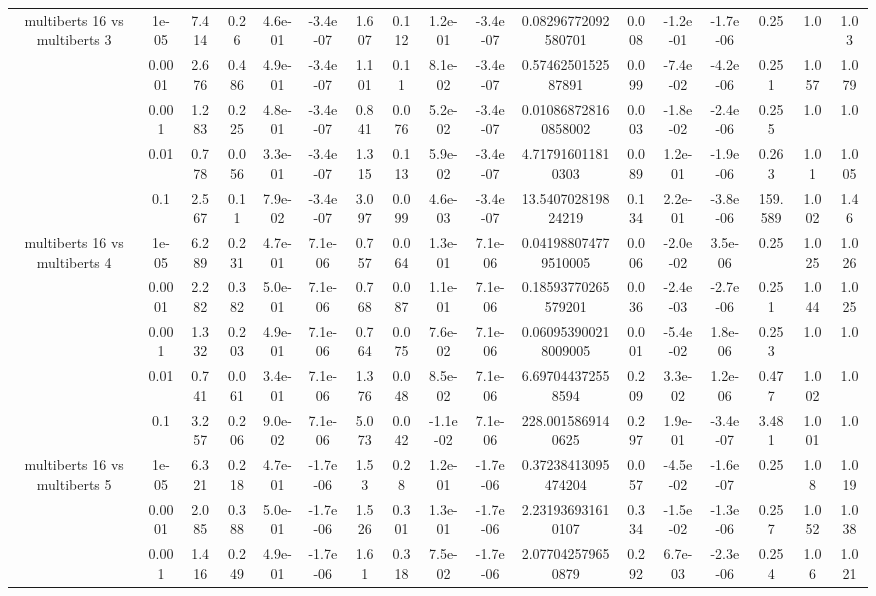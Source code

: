 \begin{tabular}{|c|c|c|c|c|c|c|c|c|c|c|c|c|c|c|c|c|}
\hline
\multirow{5}{*}{multiberts 16 vs multiberts 3} & 1e-05 & 7.414 & 0.26 & 4.6e-01 & -3.4e-07 & 1.607 & 0.112 & 1.2e-01 & -3.4e-07 & 0.08296772092580701 & 0.008 & -1.2e-01 & -1.7e-06 & 0.25 & 1.0 & 1.03 \\
 & 0.0001 & 2.676 & 0.486 & 4.9e-01 & -3.4e-07 & 1.101 & 0.11 & 8.1e-02 & -3.4e-07 & 0.5746250152587891 & 0.099 & -7.4e-02 & -4.2e-06 & 0.251 & 1.057 & 1.079 \\
 & 0.001 & 1.283 & 0.225 & 4.8e-01 & -3.4e-07 & 0.841 & 0.076 & 5.2e-02 & -3.4e-07 & 0.010868728160858002 & 0.003 & -1.8e-02 & -2.4e-06 & 0.255 & 1.0 & 1.0 \\
 & 0.01 & 0.778 & 0.056 & 3.3e-01 & -3.4e-07 & 1.315 & 0.113 & 5.9e-02 & -3.4e-07 & 4.717916011810303 & 0.089 & 1.2e-01 & -1.9e-06 & 0.263 & 1.01 & 1.005 \\
 & 0.1 & 2.567 & 0.11 & 7.9e-02 & -3.4e-07 & 3.097 & 0.099 & 4.6e-03 & -3.4e-07 & 13.540702819824219 & 0.134 & 2.2e-01 & -3.8e-06 & 159.589 & 1.002 & 1.46 \\
\hline
\multirow{5}{*}{multiberts 16 vs multiberts 4} & 1e-05 & 6.289 & 0.231 & 4.7e-01 & 7.1e-06 & 0.757 & 0.064 & 1.3e-01 & 7.1e-06 & 0.041988074779510005 & 0.006 & -2.0e-02 & 3.5e-06 & 0.25 & 1.025 & 1.026 \\
 & 0.0001 & 2.282 & 0.382 & 5.0e-01 & 7.1e-06 & 0.768 & 0.087 & 1.1e-01 & 7.1e-06 & 0.18593770265579201 & 0.036 & -2.4e-03 & -2.7e-06 & 0.251 & 1.044 & 1.025 \\
 & 0.001 & 1.332 & 0.203 & 4.9e-01 & 7.1e-06 & 0.764 & 0.075 & 7.6e-02 & 7.1e-06 & 0.060953900218009005 & 0.001 & -5.4e-02 & 1.8e-06 & 0.253 & 1.0 & 1.0 \\
 & 0.01 & 0.741 & 0.061 & 3.4e-01 & 7.1e-06 & 1.376 & 0.048 & 8.5e-02 & 7.1e-06 & 6.697044372558594 & 0.209 & 3.3e-02 & 1.2e-06 & 0.477 & 1.002 & 1.0 \\
 & 0.1 & 3.257 & 0.206 & 9.0e-02 & 7.1e-06 & 5.073 & 0.042 & -1.1e-02 & 7.1e-06 & 228.0015869140625 & 0.297 & 1.9e-01 & -3.4e-07 & 3.481 & 1.001 & 1.0 \\
\hline
\multirow{5}{*}{multiberts 16 vs multiberts 5} & 1e-05 & 6.321 & 0.218 & 4.7e-01 & -1.7e-06 & 1.53 & 0.28 & 1.2e-01 & -1.7e-06 & 0.37238413095474204 & 0.057 & -4.5e-02 & -1.6e-07 & 0.25 & 1.08 & 1.019 \\
 & 0.0001 & 2.085 & 0.388 & 5.0e-01 & -1.7e-06 & 1.526 & 0.301 & 1.3e-01 & -1.7e-06 & 2.231936931610107 & 0.334 & -1.5e-02 & -1.3e-06 & 0.257 & 1.052 & 1.038 \\
 & 0.001 & 1.416 & 0.249 & 4.9e-01 & -1.7e-06 & 1.61 & 0.318 & 7.5e-02 & -1.7e-06 & 2.077042579650879 & 0.292 & 6.7e-03 & -2.3e-06 & 0.254 & 1.06 & 1.021 \\

\end{tabular}
